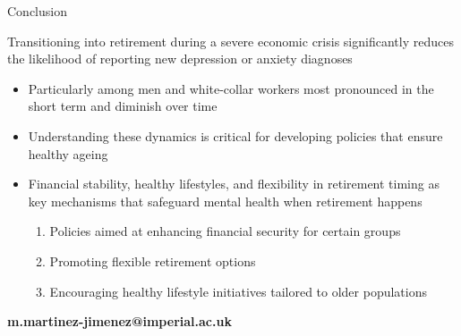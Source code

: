 \documentclass{beamer}
\begin{document}
\begin{frame}{Conclusion}
\begin{block}{}
\centering
\footnotesize
 Transitioning into \begingroup\color{Blue}retirement \endgroup during a \begingroup\color{Blue}severe economic crisis  \endgroup significantly \begingroup\color{Blue}reduces \endgroup the likelihood of reporting new \begingroup\color{Blue}depression or anxiety diagnoses \endgroup
\end{block}

\vskip 0.5cm

    \begin{itemize}
    \scriptsize
        \item<2-> Particularly among \begingroup\color{Blue}men \endgroup and \begingroup\color{Blue}white-collar \endgroup workers most pronounced in the \begingroup\color{Blue}short term \endgroup and diminish over time 
        
       \item<3-> Understanding these \begingroup\color{Blue}dynamics \endgroup is critical for developing policies that ensure \begingroup\color{Blue}healthy ageing  \endgroup
       
        \item<4-> \begingroup\color{Blue}Financial stability\endgroup, \begingroup\color{Blue}healthy lifestyles\endgroup, and \begingroup\color{Blue}flexibility \endgroup in retirement timing as key mechanisms that safeguard mental health when retirement happens

        \begin{enumerate}
        \scriptsize
            \item<5-> Policies aimed at \begingroup\color{Blue}enhancing financial security \endgroup for certain groups
             \item<6-> Promoting \begingroup\color{Blue}flexible  \endgroup retirement options
             \item<7-> Encouraging \begingroup\color{Blue}healthy lifestyle \endgroup initiatives tailored to older populations
        \end{enumerate}
    \end{itemize}
\end{frame}


\begin{frame}
\vspace{1.25cm}


\vspace{0.5cm}
\normalsize \begingroup\color{lightgray}\textbf{m.martinez-jimenez@imperial.ac.uk}\endgroup


\end{frame}

\appendix
\end{document}
